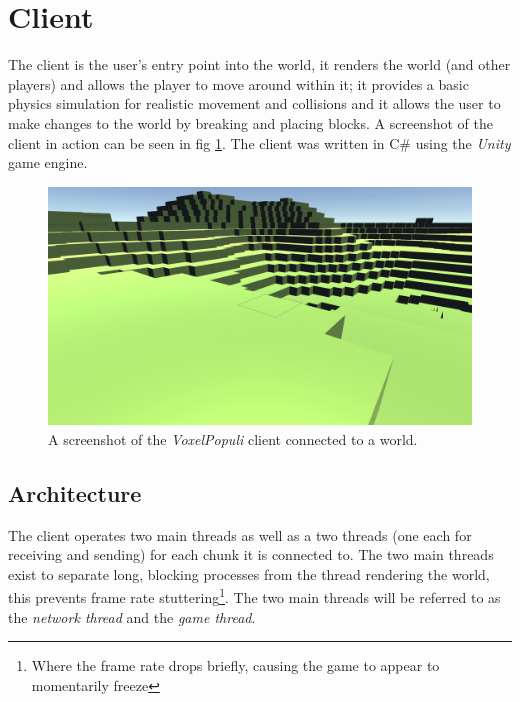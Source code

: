 \documentclass[10pt,twoside,notitlepage,a4paper]{report}
\newcommand{\unity}{\emph{Unity}}
\newcommand{\voxpop}{\emph{VoxelPopuli}}
\begin{document}
	\section{Client}
	\label{sec:client}
	The client is the user's entry point into the world, it renders the world (and other players) and allows the player to move around within it; it provides a basic physics simulation for realistic movement and collisions and it allows the user to make changes to the world by breaking and placing blocks. A screenshot of the client in action can be seen in fig \ref{fig:client}. The client was written in C\# using the \unity{} game engine.
	
	\begin{figure}
		\includegraphics[width=\textwidth]{client.png}
		\caption{A screenshot of the \voxpop{} client connected to a world.}
		\label{fig:client}
	\end{figure}
	
	\subsection{Architecture} %
	The client operates two main threads as well as a two threads (one each for receiving and sending) for each chunk it is connected to. The two main threads exist to separate long, blocking processes from the thread rendering the world, this prevents frame rate stuttering\footnote{Where the frame rate drops briefly, causing the game to appear to momentarily freeze}. The two main threads will be referred to as the \emph{network thread} and the \emph{game thread}.
	
\end{document}
